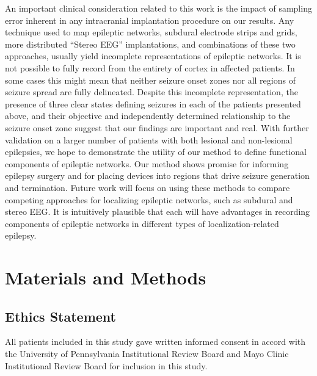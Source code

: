 An important clinical consideration related to this work is the impact of sampling error inherent in any intracranial implantation procedure on our results. Any technique used to map epileptic networks, subdural electrode strips and grids, more distributed ``Stereo EEG'' implantations, and combinations of these two approaches, usually yield incomplete representations of epileptic networks. It is not possible to fully record from the entirety of cortex in affected patients. In some cases this might mean that neither seizure onset zones nor all regions of seizure spread are fully delineated.  Despite this incomplete representation, the presence of three clear states defining seizures in each of the patients presented above, and their objective and independently determined relationship to the seizure onset zone suggest that our findings are important and real. With further validation on a larger number of patients with both lesional and non-lesional epilepsies, we hope to demonstrate the utility of our method to define functional components of epileptic networks. Our method shows promise for informing epilepsy surgery and for placing devices into regions that drive seizure generation and termination. Future work will focus on using these methods to compare competing approaches for localizing epileptic networks, such as subdural and stereo EEG.  It is intuitively plausible that each will have advantages in recording components of epileptic networks in different types of localization-related epilepsy.

\section{Materials and Methods}
\subsection{Ethics Statement}
    All patients included in this study gave written informed consent in accord with the University of Pennsylvania Institutional Review Board and Mayo Clinic Institutional Review Board for inclusion in this study.

